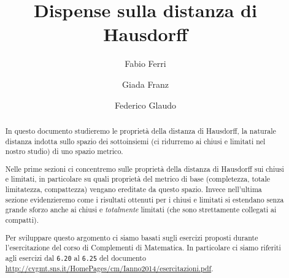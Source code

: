 \documentclass[a4paper,12pt]{article}
\title{Dispense sulla distanza di Hausdorff}
\author{Fabio Ferri \and Giada Franz \and Federico Glaudo}
\begin{document}
\maketitle


\begin{abstract}
	In questo documento studieremo le proprietà della distanza di Hausdorff, la naturale distanza indotta sullo spazio dei sottoinsiemi (ci ridurremo ai chiusi e limitati nel nostro studio) di uno spazio metrico. 
	
	Nelle prime sezioni ci concentremo sulle proprietà della distanza di Hausdorff sui chiusi e limitati, in particolare su quali proprietà del metrico di base (completezza, totale limitatezza, compattezza) vengano ereditate da questo spazio. 
	Invece nell'ultima sezione evidenzieremo come i risultati ottenuti per i chiusi e limitati si estendano senza grande sforzo anche ai chiusi e \emph{totalmente} limitati (che sono strettamente collegati ai compatti).

	Per sviluppare questo argomento ci siamo basati sugli esercizi proposti durante l'esercitazione del corso di Complementi di Matematica. In particolare ci siamo riferiti agli esercizi dal \texttt{6.20} al \texttt{6.25} del documento \url{http://cvgmt.sns.it/HomePages/cm/Ianno2014/esercitazioni.pdf}.
\end{abstract}
\clearpage






\end{document}
